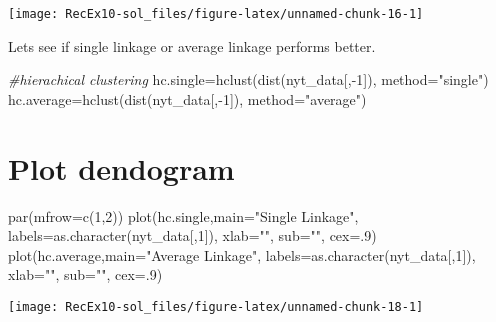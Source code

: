 \documentclass[
]{article}
\newenvironment{Shaded}{\begin{snugshade}}{\end{snugshade}}
\newcommand{\AttributeTok}[1]{\textcolor[rgb]{0.77,0.63,0.00}{#1}}
\newcommand{\CommentTok}[1]{\textcolor[rgb]{0.56,0.35,0.01}{\textit{#1}}}
\newcommand{\DecValTok}[1]{\textcolor[rgb]{0.00,0.00,0.81}{#1}}
\newcommand{\FunctionTok}[1]{\textcolor[rgb]{0.00,0.00,0.00}{#1}}
\newcommand{\NormalTok}[1]{#1}
\newcommand{\OtherTok}[1]{\textcolor[rgb]{0.56,0.35,0.01}{#1}}
\newcommand{\SpecialCharTok}[1]{\textcolor[rgb]{0.00,0.00,0.00}{#1}}
\newcommand{\StringTok}[1]{\textcolor[rgb]{0.31,0.60,0.02}{#1}}
\begin{document}
\begin{center}\texttt{[image: RecEx10-sol\_files/figure-latex/unnamed-chunk-16-1]} \end{center}

Lets see if single linkage or average linkage performs better.

\begin{Shaded}
\begin{Highlighting}[]
\CommentTok{\#hierachical clustering}
\NormalTok{hc.single}\OtherTok{=}\FunctionTok{hclust}\NormalTok{(}\FunctionTok{dist}\NormalTok{(nyt\_data[,}\SpecialCharTok{{-}}\DecValTok{1}\NormalTok{]), }\AttributeTok{method=}\StringTok{"single"}\NormalTok{)}
\NormalTok{hc.average}\OtherTok{=}\FunctionTok{hclust}\NormalTok{(}\FunctionTok{dist}\NormalTok{(nyt\_data[,}\SpecialCharTok{{-}}\DecValTok{1}\NormalTok{]), }\AttributeTok{method=}\StringTok{"average"}\NormalTok{)}
\end{Highlighting}
\end{Shaded}

\hypertarget{plot-dendogram}{%
\section{Plot dendogram}\label{plot-dendogram}}

\begin{Shaded}
\begin{Highlighting}[]
\FunctionTok{par}\NormalTok{(}\AttributeTok{mfrow=}\FunctionTok{c}\NormalTok{(}\DecValTok{1}\NormalTok{,}\DecValTok{2}\NormalTok{))}
\FunctionTok{plot}\NormalTok{(hc.single,}\AttributeTok{main=}\StringTok{"Single Linkage"}\NormalTok{, }
     \AttributeTok{labels=}\FunctionTok{as.character}\NormalTok{(nyt\_data[,}\DecValTok{1}\NormalTok{]), }\AttributeTok{xlab=}\StringTok{""}\NormalTok{, }\AttributeTok{sub=}\StringTok{""}\NormalTok{, }\AttributeTok{cex=}\NormalTok{.}\DecValTok{9}\NormalTok{)}
\FunctionTok{plot}\NormalTok{(hc.average,}\AttributeTok{main=}\StringTok{"Average Linkage"}\NormalTok{, }
     \AttributeTok{labels=}\FunctionTok{as.character}\NormalTok{(nyt\_data[,}\DecValTok{1}\NormalTok{]), }\AttributeTok{xlab=}\StringTok{""}\NormalTok{, }\AttributeTok{sub=}\StringTok{""}\NormalTok{, }\AttributeTok{cex=}\NormalTok{.}\DecValTok{9}\NormalTok{)}
\end{Highlighting}
\end{Shaded}

\begin{center}\texttt{[image: RecEx10-sol\_files/figure-latex/unnamed-chunk-18-1]} \end{center}
\end{document}
